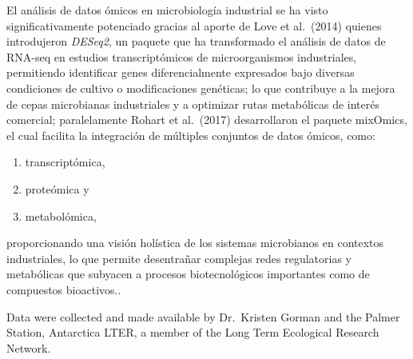 \documentclass[
  letterpaper,
  DIV=11,
  numbers=noendperiod]{scrreprt}
\providecommand{\tightlist}{%
  \setlength{\itemsep}{0pt}\setlength{\parskip}{0pt}}
\begin{document}
\begin{tcolorbox}[enhanced jigsaw, toptitle=1mm, colbacktitle=quarto-callout-caution-color!10!white, breakable, opacityback=0, toprule=.15mm, coltitle=black, colframe=quarto-callout-caution-color-frame, bottomtitle=1mm, bottomrule=.15mm, titlerule=0mm, title=\textcolor{quarto-callout-caution-color}{\faFire}\hspace{0.5em}{Expandir para aprender son el analis de datos ómicos}, colback=white, arc=.35mm, rightrule=.15mm, leftrule=.75mm, left=2mm, opacitybacktitle=0.6]

El análisis de datos ómicos en microbiología industrial se ha visto
significativamente potenciado gracias al aporte de Love et al.~(2014)
quienes introdujeron \emph{DESeq2}, un paquete que ha transformado el
análisis de datos de RNA-seq en estudios transcriptómicos de
microorganismos industriales, permitiendo identificar genes
diferencialmente expresados bajo diversas condiciones de cultivo o
modificaciones genéticas; lo que contribuye a la mejora de cepas
microbianas industriales y a optimizar rutas metabólicas de interés
comercial; paralelamente Rohart et al.~(2017) desarrollaron el paquete
mixOmics, el cual facilita la integración de múltiples conjuntos de
datos ómicos, como:

\begin{enumerate}
\def\labelenumi{(\roman{enumi})}
\tightlist
\item
  transcriptómica,
\item
  proteómica y
\item
  metabolómica,
\end{enumerate}

proporcionando una visión holística de los sistemas microbianos en
contextos industriales, lo que permite desentrañar complejas redes
regulatorias y metabólicas que subyacen a procesos biotecnológicos
importantes como de compuestos bioactivos..

\end{tcolorbox}

\begin{tcolorbox}[enhanced jigsaw, toptitle=1mm, colbacktitle=quarto-callout-caution-color!10!white, breakable, opacityback=0, toprule=.15mm, coltitle=black, colframe=quarto-callout-caution-color-frame, bottomtitle=1mm, bottomrule=.15mm, titlerule=0mm, title=\textcolor{quarto-callout-caution-color}{\faFire}\hspace{0.5em}{Expand to learn more about where the data was collected}, colback=white, arc=.35mm, rightrule=.15mm, leftrule=.75mm, left=2mm, opacitybacktitle=0.6]

Data were collected and made available by Dr.~Kristen Gorman and the
Palmer Station, Antarctica LTER, a member of the Long Term Ecological
Research Network.

\end{tcolorbox}
\end{document}
